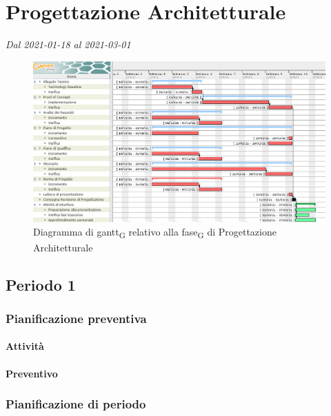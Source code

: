 \section{Progettazione Architetturale}
\textit{Dal 2021-01-18 al 2021-03-01}


\begin{figure}[H]
	\centering
	\includegraphics[scale=0.50]{res/images/03_gantt_progettazione.png}
	\caption{Diagramma di gantt\textsubscript{G} relativo alla fase\textsubscript{G} di Progettazione Architetturale}
\end{figure}


\subsection{Periodo 1}

\subsubsection{Pianificazione preventiva}

\paragraph{Attività}

\planningTable{
	
}

\paragraph{Preventivo}


\subsubsection{Pianificazione di periodo}

